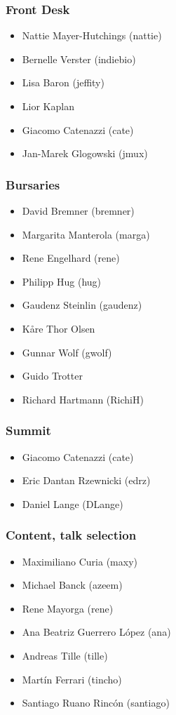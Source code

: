 \documentclass[t]{beamer}
\begin{document}
\begin{frame}
	\frametitle{Front Desk}
	\begin{itemize}
		\item Nattie Mayer-Hutchings (nattie)
		\item Bernelle Verster (indiebio)
		\item Lisa Baron (jeffity)
		\item Lior Kaplan
		\item Giacomo Catenazzi (cate)
		\item Jan-Marek Glogowski (jmux)
	\end{itemize}
\end{frame}

\begin{frame}
	\frametitle{Bursaries}
	\begin{itemize}
		\item David Bremner (bremner)
		\item Margarita Manterola (marga)
		\item Rene Engelhard (rene)
		\item Philipp Hug (hug)
		\item Gaudenz Steinlin (gaudenz)
		\item Kåre Thor Olsen
		\item Gunnar Wolf (gwolf)
		\item Guido Trotter
		\item Richard Hartmann (RichiH)
	\end{itemize}
\end{frame}

\begin{frame}
	\frametitle{Summit}
	\begin{itemize}
		\item Giacomo Catenazzi (cate)
		\item Eric Dantan Rzewnicki (edrz)
		\item Daniel Lange (DLange)
	\end{itemize}
\end{frame}

\begin{frame}
	\frametitle{Content, talk selection}
	\begin{itemize}
		\item Maximiliano Curia (maxy)
		\item Michael Banck (azeem)
		\item Rene Mayorga (rene)
		\item Ana Beatriz Guerrero López (ana)
		\item Andreas Tille (tille)
		\item Martín Ferrari (tincho)
		\item Santiago Ruano Rincón (santiago)
	\end{itemize}
\end{frame}
\end{document}
